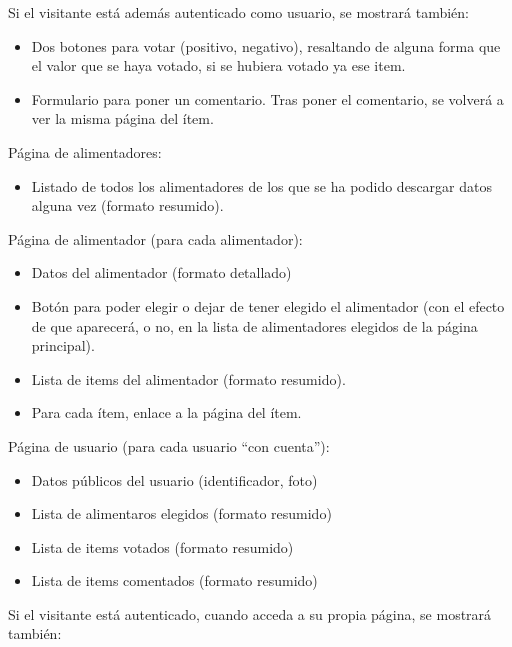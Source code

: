     Si el visitante está además autenticado como usuario, se mostrará también:

    \begin{itemize}
    \item Dos botones para votar (positivo, negativo), resaltando de alguna forma que el valor que se haya votado, si se hubiera votado ya ese item.
    \item Formulario para poner un comentario. Tras poner el comentario, se volverá a ver la misma página del ítem.
    \end{itemize}

  \item Página de alimentadores:

    \begin{itemize}
    \item Listado de todos los alimentadores de los que se ha podido descargar datos alguna vez (formato resumido).
    \end{itemize}
    
  \item Página de alimentador (para cada alimentador):

    \begin{itemize}
    \item Datos del alimentador (formato detallado)
    \item Botón para poder elegir o dejar de tener elegido el alimentador (con el efecto de que aparecerá, o no, en la lista de alimentadores elegidos de la página principal).
    \item Lista de items del alimentador (formato resumido).
    \item Para cada ítem, enlace a la página del ítem.
    \end{itemize}

  \item Página de usuario (para cada usuario ``con cuenta''):

    \begin{itemize}
    \item Datos públicos del usuario (identificador, foto)
    \item Lista de alimentaros elegidos (formato resumido)
    \item Lista de items votados (formato resumido)
    \item Lista de items comentados (formato resumido)
    \end{itemize}

    Si el visitante está autenticado, cuando acceda a su propia página, se mostrará también:

